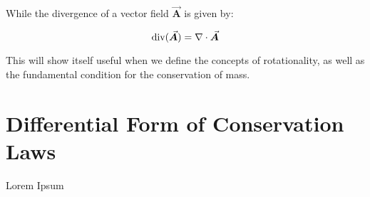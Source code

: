 \documentclass[11pt]{article}
\begin{document}
\noindent
While the divergence of a vector field $\vec{\bm{A}}$ is given by:

\begin{equation*}
    \textnormal{div}(\vec{\bm{A}}) = \nabla \cdot \vec{\bm{A}}
\end{equation*}

\noindent
This will show itself useful when we define the concepts of rotationality, as well as the fundamental condition for the conservation of mass. \\

\pagebreak
\section{Differential Form of Conservation Laws}
Lorem Ipsum \\

\end{document}
